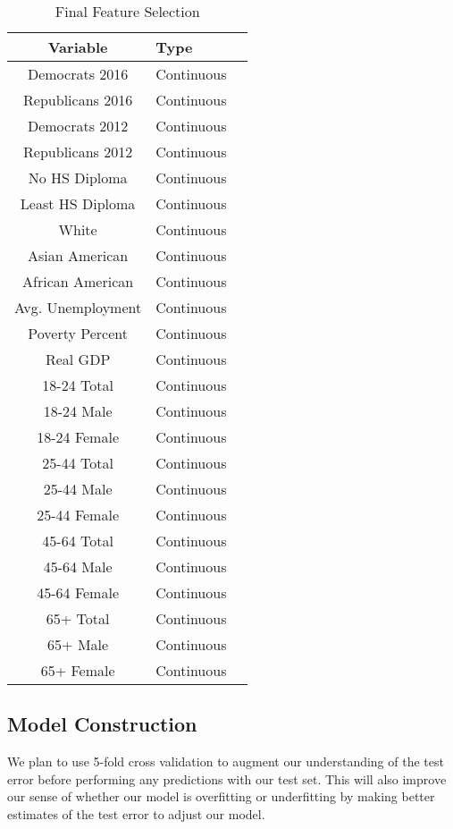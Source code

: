 \documentclass[letterpaper, twocolumn]{article}
\begin{document}
\begin{table}[htb]
    \centering
\begin{tabular}{clc} \hline
\textbf{Variable}  & \textbf{Type} \\ \hline
Democrats 2016 & Continuous   \\
Republicans 2016 & Continuous   \\
Democrats 2012 & Continuous   \\
Republicans 2012 & Continuous   \\
No HS Diploma  & Continuous   \\
Least HS Diploma & Continuous   \\
White & Continuous    \\
Asian American  & Continuous    \\
African American & Continuous    \\
Avg. Unemployment & Continuous   \\
Poverty Percent & Continuous   \\
Real GDP & Continuous   \\
18-24 Total & Continuous   \\
18-24 Male & Continuous   \\
18-24 Female & Continuous   \\
25-44 Total & Continuous   \\
25-44 Male & Continuous   \\
25-44 Female  & Continuous   \\
45-64 Total & Continuous   \\
45-64 Male & Continuous   \\
45-64 Female  & Continuous   \\
65+ Total & Continuous   \\
65+ Male & Continuous   \\
65+ Female  & Continuous   \\

\end{tabular}
    \caption{Final Feature Selection}
    \label{tab:variable}
\end{table}

\subsection{Model Construction}
We plan to use 5-fold cross validation to augment our understanding of the test error before performing any predictions with our test set. This will also improve our sense of whether our model is overfitting or underfitting by making better estimates of the test error to adjust our model.
\end{document}
